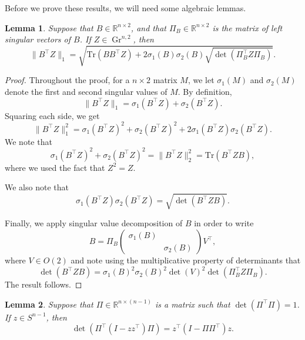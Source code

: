 \documentclass{article}
\numberwithin{equation}{section}
\newcommand{\tr}{\mathrm{Tr}}
\newcommand{\R}{\mathbb{R}}
\newtheorem{lemma}{Lemma}[section]
\DeclareMathOperator{\Gr}{Gr}
\begin{document}
Before we prove these results, we will need some algebraic lemmas. 
\begin{lemma}\label{lemma:norm-BZ-n-l}
    Suppose that $B \in \R^{n \times 2}$, and that $\Pi_B \in \R^{n \times 2}$ is the matrix of left singular vectors of $B$.
    If $Z \in \Gr^{n,2}$, then 
    \begin{equation}\label{eq:norm-BZ-n-2}
        \|B^{\intercal}Z\|_1 = \sqrt{\tr(BB^{\intercal}Z) + 2\sigma_1(B) \sigma_2(B)\sqrt{\det(\Pi_B^{\intercal}Z\Pi_B)}}.
     \end{equation}
\end{lemma}
\begin{proof}
    Throughout the proof, for a $n\times 2$ matrix $M$, we let $\sigma_1(M)$ and $\sigma_2(M)$ denote the first and second singular values of $M$.
    By definition, 
    \[
        \|B^{\intercal}Z\|_1 = \sigma_1(B^{\intercal}Z) + \sigma_2(B^{\intercal}Z).
    \]
    Squaring each side, we get
    \[
        \|B^{\intercal}Z\|_1^2 = \sigma_1(B^{\intercal}Z)^2 + \sigma_2(B^{\intercal}Z)^2 + 2\sigma_1(B^{\intercal}Z)\sigma_2(B^{\intercal}Z).
    \]
    We note that 
    \[
        \sigma_1(B^{\intercal}Z)^2 + \sigma_2(B^{\intercal}Z)^2 = \|B^{\intercal}Z\|_2^2 = \tr(B^{\intercal}ZB),
    \]
    where we 
    used the fact that $Z^2 = Z$.

    We also note that
    \[
        \sigma_1(B^{\intercal}Z)\sigma_2(B^{\intercal}Z) = \sqrt{\det(B^{\intercal}ZB)}.
    \]

    Finally, we apply singular value decomposition of $B$ in order to write
    \[
        B = \Pi_B \begin{pmatrix}\sigma_1(B) & \\ & \sigma_2(B)\end{pmatrix} V^{\intercal},
    \]
    where $V \in O(2)$ and note using the multiplicative property of determinants that
    \[
        \det(B^{\intercal}ZB) =  \sigma_1(B)^2\sigma_2(B)^2\det(V)^2\det(\Pi_B^{\intercal}Z\Pi_B).
    \]
    The result follows.
\end{proof}

\begin{lemma}\label{lemma:norm-BZ-n-2}
    Suppose that $\Pi \in \R^{n \times (n-1)}$ is a matrix such that
    $\det(\Pi^{\intercal}\Pi) = 1$.
    If $z\in S^{n-1}$,  then
    \[
    \det(\Pi^{\intercal}(I-zz^{\intercal})\Pi) = z^{\intercal}(I-\Pi\Pi^{\intercal})z.
     \]
\end{lemma}
\end{document}
